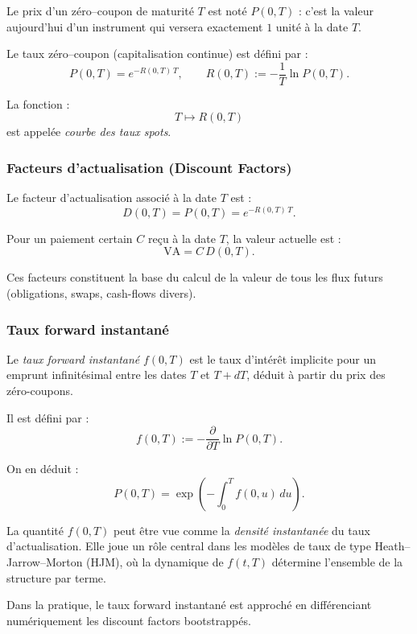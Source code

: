 \documentclass[11pt,a4paper]{article}
\newcommand{\1}{\mathbf{1}}
\begin{document}
Le prix d'un z\'ero--coupon de maturit\'e $T$ est not\'e $P(0,T)$ : c'est la valeur
aujourd'hui d'un instrument qui versera exactement $1$ unit\'e \`a la date $T$.

Le taux z\'ero--coupon (capitalisation continue) est d\'efini par :
\[
P(0,T) = e^{-R(0,T)\,T},
\qquad
R(0,T) := -\frac{1}{T}\ln P(0,T).
\]

La fonction :
\[
T \longmapsto R(0,T)
\]
est appel\'ee \emph{courbe des taux spots}.

\subsubsection{Facteurs d'actualisation (Discount Factors)}

Le facteur d'actualisation associ\'e \`a la date $T$ est :
\[
D(0,T) = P(0,T) = e^{-R(0,T)\,T}.
\]

Pour un paiement certain $C$ re\c{c}u \`a la date $T$, la valeur actuelle est :
\[
\text{VA} = C\, D(0,T).
\]

Ces facteurs constituent la base du calcul de la valeur de tous les flux futurs
(obligations, swaps, cash-flows divers).

\subsubsection{Taux forward instantan\'e}

Le \emph{taux forward instantan\'e} $f(0,T)$ est le taux d'int\'er\^et implicite
pour un emprunt infinitésimal entre les dates $T$ et $T + dT$, d\'eduit \`a partir
du prix des z\'ero-coupons.

Il est d\'efini par :
\[
f(0,T) := -\frac{\partial}{\partial T} \ln P(0,T).
\]

On en d\'eduit :
\[
P(0,T)
=
\exp\!\left( -\int_0^T f(0,u)\,du \right).
\]

La quantit\'e $f(0,T)$ peut \^etre vue comme la \emph{densit\'e instantan\'ee}
du taux d'actualisation. Elle joue un r\^ole central dans les mod\`eles de taux
de type Heath--Jarrow--Morton (HJM), o\`u la dynamique de $f(t,T)$ d\'etermine
l'ensemble de la structure par terme.

\medskip

Dans la pratique, le taux forward instantan\'e est approch\'e en diff\'erenciant
num\'eriquement les discount factors bootstrapp\'es.
\end{document}
